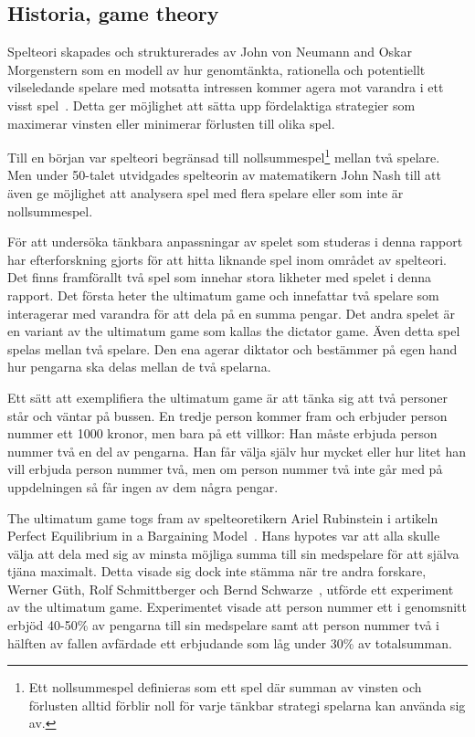 \subsection{Historia, game theory}
Spelteori skapades och strukturerades av John von Neumann and Oskar Morgenstern som en modell av hur genomtänkta, rationella och potentiellt vilseledande spelare med motsatta intressen kommer agera mot varandra i ett visst spel~\cite{Flake:2001}. Detta ger möjlighet att sätta upp fördelaktiga strategier som maximerar vinsten eller minimerar förlusten till olika spel.

Till en början var spelteori begränsad till nollsummespel\footnote{Ett nollsummespel definieras som ett spel där summan av vinsten och förlusten alltid förblir noll för varje tänkbar strategi spelarna kan använda sig av.} mellan två spelare. Men under 50-talet utvidgades spelteorin av matematikern John Nash till att även ge möjlighet att analysera spel med flera spelare eller som inte är nollsummespel. 

För att undersöka tänkbara anpassningar av spelet som studeras i denna rapport har efterforskning gjorts för att hitta liknande spel inom området av spelteori. Det finns framförallt två spel som innehar stora likheter med spelet i denna rapport. Det första heter the ultimatum game och innefattar två spelare som interagerar med varandra för att dela på en summa pengar. Det andra spelet är en variant av the ultimatum game som kallas the dictator game. Även detta spel spelas mellan två spelare. Den ena agerar diktator och bestämmer på egen hand hur pengarna ska delas mellan de två spelarna.

Ett sätt att exemplifiera the ultimatum game är att tänka sig att två personer står och väntar på bussen. En tredje person kommer fram och erbjuder person nummer ett 1000 kronor, men bara på ett villkor: Han måste erbjuda person nummer två en del av pengarna. Han får välja själv hur mycket eller hur litet han vill erbjuda person nummer två, men om person nummer två inte går med på uppdelningen så får ingen av dem några pengar.

The ultimatum game togs fram av spelteoretikern Ariel Rubinstein i artikeln Perfect Equilibrium in a Bargaining Model~\cite{Rubinstein:1982}. Hans hypotes var att alla skulle välja att dela med sig av minsta möjliga summa till sin medspelare för att själva tjäna maximalt. Detta visade sig dock inte stämma när tre andra forskare, Werner Güth, Rolf Schmittberger och Bernd Schwarze~\cite{Werner:1982}, utförde ett experiment av the ultimatum game. Experimentet visade att person nummer ett i genomsnitt erbjöd 40-50\% av pengarna till sin medspelare samt att person nummer två i hälften av fallen avfärdade ett erbjudande som låg under 30\% av totalsumman.

